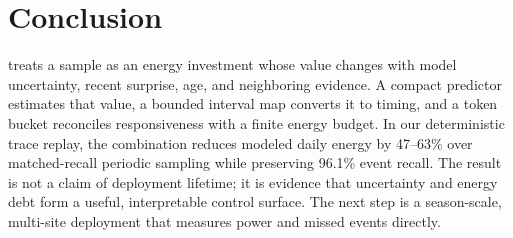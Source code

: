 \section{Conclusion}

\system treats a sample as an energy investment whose value changes with model
uncertainty, recent surprise, age, and neighboring evidence.  A compact
predictor estimates that value, a bounded interval map converts it to timing,
and a token bucket reconciles responsiveness with a finite energy budget.  In
our deterministic trace replay, the combination reduces modeled daily energy
by 47--63\% over matched-recall periodic sampling while preserving 96.1\%
event recall.  The result is not a claim of deployment lifetime; it is evidence
that uncertainty and energy debt form a useful, interpretable control surface.
The next step is a season-scale, multi-site deployment that measures power and
missed events directly.

